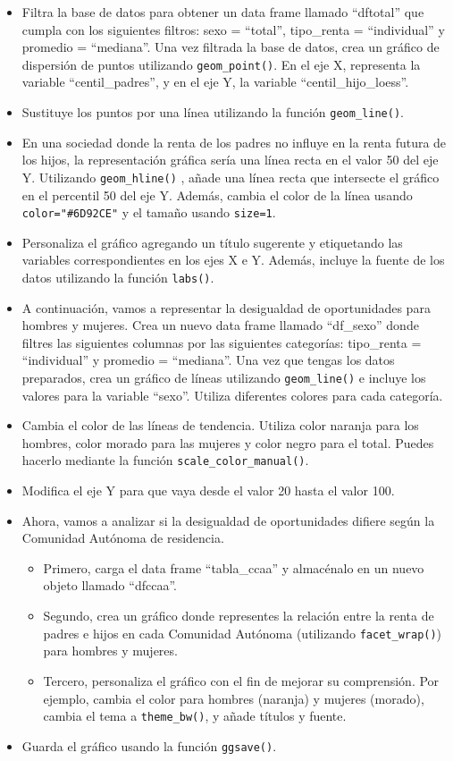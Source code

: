 \documentclass[
]{article}
\providecommand{\tightlist}{%
  \setlength{\itemsep}{0pt}\setlength{\parskip}{0pt}}
\begin{document}
\begin{itemize}
\item
  Filtra la base de datos para obtener un data frame llamado ``dftotal''
  que cumpla con los siguientes filtros: sexo = ``total'', tipo\_renta =
  ``individual'' y promedio = ``mediana''. Una vez filtrada la base de
  datos, crea un gráfico de dispersión de puntos utilizando
  \texttt{geom\_point()}. En el eje X, representa la variable
  ``centil\_padres'', y en el eje Y, la variable
  ``centil\_hijo\_loess''.
\item
  Sustituye los puntos por una línea utilizando la función
  \texttt{geom\_line()}.
\item
  En una sociedad donde la renta de los padres no influye en la renta
  futura de los hijos, la representación gráfica sería una línea recta
  en el valor 50 del eje Y. Utilizando \texttt{geom\_hline()} , añade
  una línea recta que intersecte el gráfico en el percentil 50 del eje
  Y. Además, cambia el color de la línea usando
  \texttt{color="\#6D92CE"} y el tamaño usando \texttt{size=1}.
\item
  Personaliza el gráfico agregando un título sugerente y etiquetando las
  variables correspondientes en los ejes X e Y. Además, incluye la
  fuente de los datos utilizando la función \texttt{labs()}.
\item
  A continuación, vamos a representar la desigualdad de oportunidades
  para hombres y mujeres. Crea un nuevo data frame llamado ``df\_sexo''
  donde filtres las siguientes columnas por las siguientes categorías:
  tipo\_renta = ``individual'' y promedio = ``mediana''. Una vez que
  tengas los datos preparados, crea un gráfico de líneas utilizando
  \texttt{geom\_line()} e incluye los valores para la variable ``sexo''.
  Utiliza diferentes colores para cada categoría.
\item
  Cambia el color de las líneas de tendencia. Utiliza color naranja para
  los hombres, color morado para las mujeres y color negro para el
  total. Puedes hacerlo mediante la función
  \texttt{scale\_color\_manual()}.
\item
  Modifica el eje Y para que vaya desde el valor 20 hasta el valor 100.
\item
  Ahora, vamos a analizar si la desigualdad de oportunidades difiere
  según la Comunidad Autónoma de residencia.

  \begin{itemize}
  \tightlist
  \item
    Primero, carga el data frame ``tabla\_ccaa'' y almacénalo en un
    nuevo objeto llamado ``dfccaa''.
  \item
    Segundo, crea un gráfico donde representes la relación entre la
    renta de padres e hijos en cada Comunidad Autónoma (utilizando
    \texttt{facet\_wrap()}) para hombres y mujeres.
  \item
    Tercero, personaliza el gráfico con el fin de mejorar su
    comprensión. Por ejemplo, cambia el color para hombres (naranja) y
    mujeres (morado), cambia el tema a \texttt{theme\_bw()}, y añade
    títulos y fuente.
  \end{itemize}
\item
  Guarda el gráfico usando la función \texttt{ggsave()}.
\end{itemize}
\end{document}
